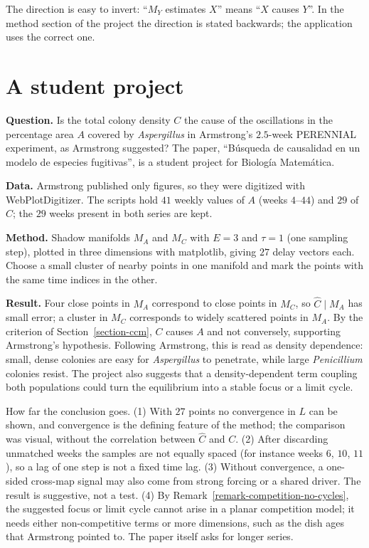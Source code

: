 \begin{remark}
\label{remark-ccm-direction}
The direction is easy to invert: ``$M_Y$
estimates $X$'' means ``$X$ causes $Y$''.
In the method section of the project the
direction is stated backwards; the
application uses the correct one.
\end{remark}

\section{A student project}
\label{section-final-paper}

\textbf{Question.}
Is the total colony density $C$ the cause of
the oscillations in the percentage area $A$
covered by \emph{Aspergillus} in Armstrong's
$2.5$-week PERENNIAL experiment, as
Armstrong suggested? The paper,
``B\'usqueda de causalidad en un modelo de
especies fugitivas'', is a student project
for Biolog\'ia Matem\'atica.

\textbf{Data.}
Armstrong published only figures, so they
were digitized with WebPlotDigitizer. The
scripts hold $41$ weekly values of $A$
(weeks $4$--$44$) and $29$ of $C$; the
$29$ weeks present in both series are kept.

\textbf{Method.}
Shadow manifolds $M_A$ and $M_C$ with
$E=3$ and $\tau=1$ (one sampling step),
plotted in three dimensions with
matplotlib, giving $27$ delay vectors each.
Choose a small cluster of nearby points
in one manifold and mark the points with
the same time indices in the other.

\textbf{Result.}
Four close points in $M_A$ correspond to
close points in $M_C$, so $\hat C\mid M_A$
has small error; a cluster in $M_C$
corresponds to widely scattered points in
$M_A$. By the criterion of
Section~\ref{section-ccm}, $C$ causes $A$
and not conversely, supporting Armstrong's
hypothesis. Following Armstrong, this is read
as density dependence: small, dense
colonies are easy for \emph{Aspergillus}
to penetrate, while large
\emph{Penicillium} colonies resist. The
project also suggests that a
density-dependent term coupling both
populations could turn the equilibrium
into a stable focus or a limit cycle.

\begin{remark}
\label{remark-final-paper-caveats}
How far the conclusion goes. (1) With $27$
points no convergence in $L$ can be shown,
and convergence is the defining feature of
the method; the comparison was visual,
without the correlation between $\hat C$
and $C$. (2) After discarding unmatched
weeks the samples are not equally spaced
(for instance weeks $6$, $10$, $11$), so a
lag of one step is not a fixed time lag.
(3) Without convergence, a one-sided
cross-map signal may also come from strong
forcing or a shared driver. The result is
suggestive, not a test. (4) By
Remark~\ref{remark-competition-no-cycles},
the suggested focus or limit cycle cannot
arise in a planar competition model; it
needs either non-competitive terms or more
dimensions, such as the dish ages that
Armstrong pointed to. The paper itself asks
for longer series.
\end{remark}

